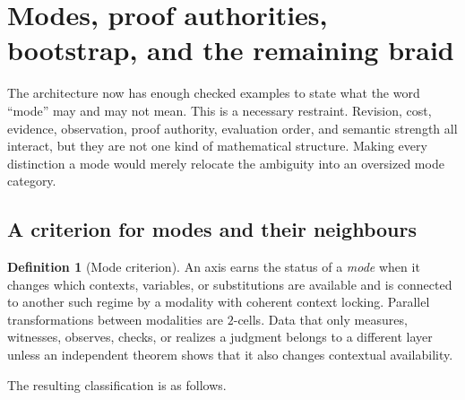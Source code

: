 \documentclass[11pt]{article}
\theoremstyle{definition}
\newtheorem{definition}[theorem]{Definition}
\theoremstyle{remark}
\begin{document}
\section{Modes, proof authorities, bootstrap, and the remaining braid}

The architecture now has enough checked examples to state what the word
``mode'' may and may not mean.  This is a necessary restraint.  Revision,
cost, evidence, observation, proof authority, evaluation order, and semantic
strength all interact, but they are not one kind of mathematical structure.
Making every distinction a mode would merely relocate the ambiguity into an
oversized mode category.

\subsection{A criterion for modes and their neighbours}

\begin{definition}[Mode criterion]
An axis earns the status of a \emph{mode} when it changes which contexts,
variables, or substitutions are available and is connected to another such
regime by a modality with coherent context locking.  Parallel transformations
between modalities are $2$-cells.  Data that only measures, witnesses,
observes, checks, or realizes a judgment belongs to a different layer unless
an independent theorem shows that it also changes contextual availability.
\end{definition}

The resulting classification is as follows.
\end{document}
